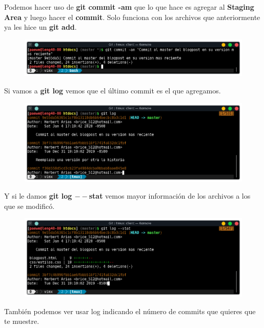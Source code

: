 \documentclass{article}
\begin{document}
Podemos hacer uso de \textbf{git commit -am} que lo que hace es agregar al
\textbf{Staging Area} y luego hacer el \textbf{commit}. Solo funciona con los
archivos que anteriormente ya les hice un \textbf{git add}.

\begin{figure}[h!]
  \centering
  \includegraphics[scale=0.75]{./Pictures/132_commit.png}
\end{figure}

Si vamos a \textbf{git log} vemos que el último commit es el que agregamos.

\begin{figure}[h!]
  \centering
  \includegraphics[scale=0.75]{./Pictures/133_log.png}
\end{figure}

Y si le damos \textbf{git log $--$stat} vemos mayor información de los archivos
a los que se modificó.

\newpage

\begin{figure}[h!]
  \centering
  \includegraphics[scale=0.75]{./Pictures/134_log_stat.png}
\end{figure}

También podemos ver usar log indicando el número de commits que quieres que te
muestre.
\end{document}
